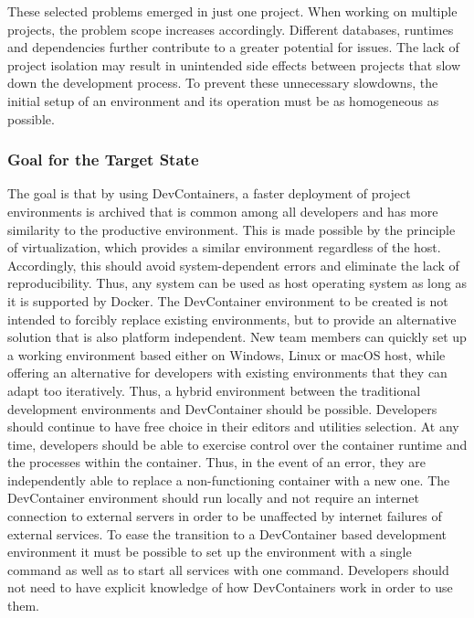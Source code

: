         These selected problems emerged in just one project. When working on multiple projects, the problem scope increases accordingly. Different databases, runtimes and dependencies further contribute to a greater potential for issues. The lack of project isolation may result in unintended side effects between projects that slow down the development process. To prevent these unnecessary slowdowns, the initial setup of an environment and its operation must be as homogeneous as possible.

        \subsubsection{Goal for the Target State}\label{sssec::goal}
        The goal is that by using DevContainers, a faster deployment of project environments is archived that is common among all developers and has more similarity to the productive environment. This is made possible by the principle of virtualization, which provides a similar environment regardless of the host. Accordingly, this should avoid system-dependent errors and eliminate the lack of reproducibility. Thus, any system can be used as host operating system as long as it is supported by Docker. The DevContainer environment to be created is not intended to forcibly replace existing environments, but to provide an alternative solution that is also platform independent. New team members can quickly set up a working environment based either on Windows, Linux or macOS host, while offering an alternative for developers with existing environments that they can adapt too iteratively. Thus, a hybrid environment between the traditional development environments and DevContainer should be possible. Developers should continue to have free choice in their editors and utilities selection.\newline
        At any time, developers should be able to exercise control over the container runtime and the processes within the container. Thus, in the event of an error, they are independently able to replace a non-functioning container with a new one. The DevContainer environment should run locally and not require an internet connection to external servers in order to be unaffected by internet failures of external services. To ease the transition to a DevContainer based development environment it must be possible to set up the environment with a single command as well as to start all services with one command. Developers should not need to have explicit knowledge of how DevContainers work in order to use them.

